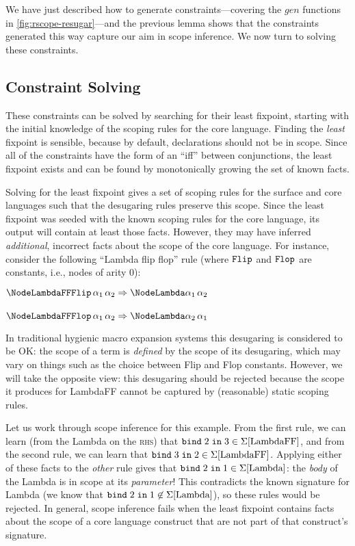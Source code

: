 We have just described how to generate constraints---covering the
$\mathit{gen}$ functions in \cref{fig:rscope-resugar}---and the previous lemma shows
that the constraints generated this way capture our aim in scope
inference. We now turn to solving these constraints.


\subsection{Constraint Solving}

These constraints can be solved by searching for their least
fixpoint, starting with the initial knowledge of the scoping rules for
the core language. Finding the \emph{least} fixpoint is sensible,
because by default, declarations should not be in scope.
Since all of the constraints have the form of an
``iff'' between conjunctions, the least fixpoint exists and can be
found by monotonically growing the set of known facts.

Solving for the least fixpoint gives a set of scoping rules for the
surface and core languages such that the desugaring rules preserve
this scope. Since the least fixpoint was seeded with the known scoping
rules for the core language, its output will contain at least those
facts.  However, they may have inferred \emph{additional}, incorrect
facts about the scope of the core language. For instance, consider the
following ``Lambda flip flop'' rule (where $\ConstRm{Flip}$ and
$\ConstRm{Flop}$ are constants, i.e., nodes of arity 0):
\begin{Table}
  $\NodeRm{LambdaFF}{\ConstRm{Flip}\,\PVar_1\,\PVar_2} \To
  \NodeRm{Lambda}{\PVar_1\,\PVar_2}$
  \\ \\
  $\NodeRm{LambdaFF}{\ConstRm{Flop}\,\PVar_1\,\PVar_2} \To
  \NodeRm{Lambda}{\PVar_2\,\PVar_1}$
\end{Table}
In traditional hygienic macro expansion systems this desugaring is
considered to be OK: the scope of a term is \emph{defined} by the
scope of its desugaring, which may vary on things such as the choice
between Flip and Flop constants. However, we will take the opposite
view: this desugaring should be rejected because the scope it produces
for LambdaFF cannot be captured by (reasonable) static scoping rules.

Let us work through scope inference for this example. From the first
rule, we can learn (from the Lambda on the \textsc{rhs}) that
$\SigBind{\text{LambdaFF}}{3}{2}$, and from the second rule, we can learn that
$\SigBind{\text{LambdaFF}}{2}{3}$. Applying either of these facts to the
\emph{other} rule gives that $\SigBind{\text{Lambda}}{1}{2}$: the \emph{body} of
the Lambda is in scope at its \emph{parameter}!  This contradicts the
known signature for Lambda (we know that $\SigNotBind{\text{Lambda}}{1}{2}$),
so these rules would be rejected.
In general, scope inference fails when the least fixpoint contains
facts about the scope of a core language construct that are not part
of that construct's signature.

